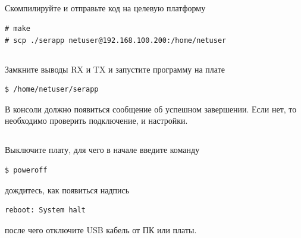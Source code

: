 \subsection{} Скомпилируйте и отправьте код на целевую платформу
\begin{lstlisting}[style=bash]
# make
# scp ./serapp netuser@192.168.100.200:/home/netuser
\end{lstlisting}

\subsection{} Замкните выводы RX и TX и запустите программу на плате
\begin{lstlisting}[style=bash]
$ /home/netuser/serapp
\end{lstlisting}
В консоли должно появиться сообщение об успешном завершении. Если нет, то необходимо проверить подключение, и настройки.

\subsection{} Выключите плату, для чего в начале введите команду
\begin{lstlisting}[style=bash]
	$ poweroff
\end{lstlisting}
дождитесь, как появиться надпись
\begin{lstlisting}[style=stdout]
	reboot: System halt
\end{lstlisting}
после чего отключите USB кабель от ПК или платы. 